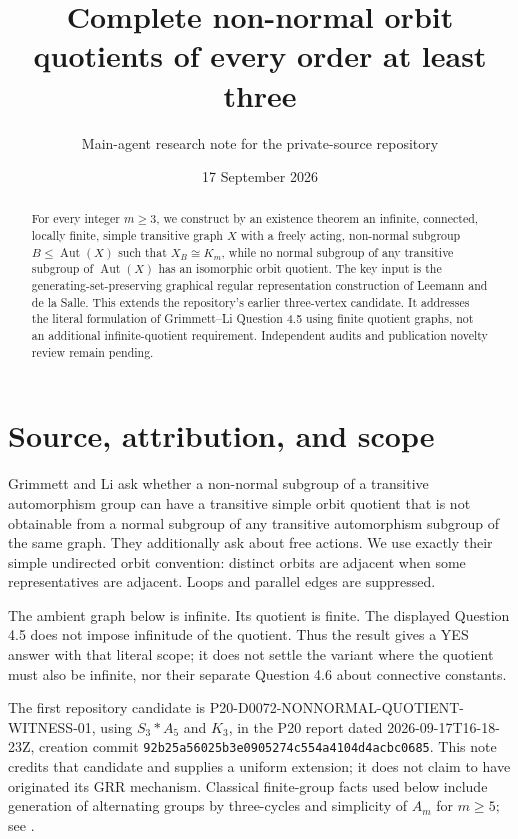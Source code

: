 \documentclass[11pt]{article}
\title{Complete non-normal orbit quotients of every order at least three}
\author{Main-agent research note for the private-source repository}
\date{17 September 2026}
\DeclareMathOperator{\Aut}{Aut}
\begin{document}
\maketitle
\begin{abstract}
For every integer $m\geq3$, we construct by an existence theorem an infinite,
connected, locally finite, simple transitive graph $X$ with a freely acting,
non-normal subgroup $B\leq\Aut(X)$ such that $X_B\cong K_m$, while no normal
subgroup of any transitive subgroup of $\Aut(X)$ has an isomorphic orbit
quotient. The key input is the generating-set-preserving graphical regular
representation construction of Leemann and de la Salle. This extends the
repository's earlier three-vertex candidate. It addresses the literal
formulation of Grimmett--Li Question 4.5 using finite quotient graphs, not an
additional infinite-quotient requirement. Independent audits and publication
novelty review remain pending.
\end{abstract}

\section{Source, attribution, and scope}
Grimmett and Li \cite[Section 4.2, Question 4.5]{GL} ask whether a non-normal
subgroup of a transitive automorphism group can have a transitive simple
orbit quotient that is not obtainable from a normal subgroup of any
transitive automorphism subgroup of the same graph. They additionally ask
about free actions. We use exactly their simple undirected orbit convention:
distinct orbits are adjacent when some representatives are adjacent.
Loops and parallel edges are suppressed.

The ambient graph below is infinite. Its quotient is finite. The displayed
Question 4.5 does not impose infinitude of the quotient. Thus the result gives
a YES answer with that literal scope; it does not settle the variant where
the quotient must also be infinite, nor their separate Question 4.6 about
connective constants.

The first repository candidate is P20-D0072-NONNORMAL-QUOTIENT-WITNESS-01,
using $S_3*A_5$ and $K_3$, in the P20 report dated
2026-09-17T16-18-23Z, creation commit
\texttt{92b25a56025b3e0905274c554a4104d4acbc0685}.
This note credits that candidate and supplies a uniform extension; it does
not claim to have originated its GRR mechanism. Classical finite-group facts
used below include generation of alternating groups by three-cycles and
simplicity of $A_m$ for $m\geq5$; see \cite[Chapter 4]{Milne}.
\end{document}
